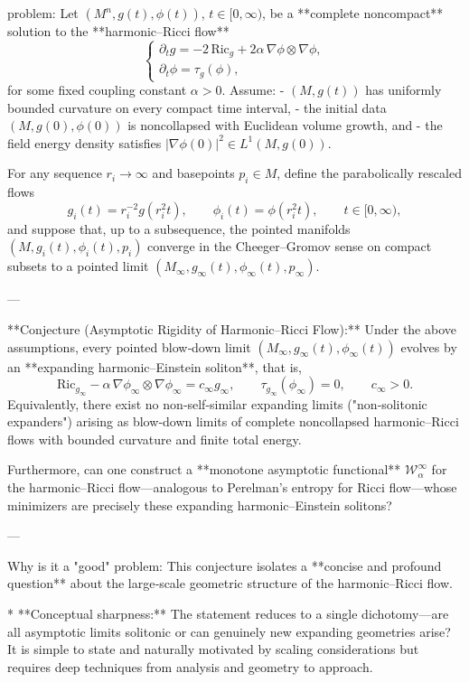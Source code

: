 problem:  
Let \((M^n,g(t),\phi(t))\), \(t\in[0,\infty)\), be a **complete noncompact** solution to the **harmonic–Ricci flow**
\[
\begin{cases}
\partial_t g = -2\,\mathrm{Ric}_g + 2\alpha\,\nabla\phi\otimes\nabla\phi, \\[3pt]
\partial_t \phi = \tau_g(\phi),
\end{cases}
\]
for some fixed coupling constant \(\alpha>0\).  
Assume:
- \((M,g(t))\) has uniformly bounded curvature on every compact time interval,
- the initial data \((M,g(0),\phi(0))\) is noncollapsed with Euclidean volume growth, and
- the field energy density satisfies \(|\nabla \phi(0)|^2\in L^1(M,g(0))\).  

For any sequence \(r_i\to\infty\) and basepoints \(p_i\in M\), define the parabolically rescaled flows
\[
g_i(t)=r_i^{-2}g(r_i^2t),\qquad \phi_i(t)=\phi(r_i^2t),\qquad t\in[0,\infty),
\]
and suppose that, up to a subsequence, the pointed manifolds \((M,g_i(t),\phi_i(t),p_i)\) converge in the Cheeger–Gromov sense on compact subsets to a pointed limit
\((M_\infty,g_\infty(t),\phi_\infty(t),p_\infty)\).

---

**Conjecture (Asymptotic Rigidity of Harmonic–Ricci Flow):**  
Under the above assumptions, every pointed blow‑down limit \((M_\infty,g_\infty(t),\phi_\infty(t))\) evolves by an **expanding harmonic–Einstein soliton**, that is,
\[
\mathrm{Ric}_{g_\infty}-\alpha\,\nabla\phi_\infty\otimes\nabla\phi_\infty=c_\infty g_\infty,\qquad
\tau_{g_\infty}(\phi_\infty)=0,\qquad c_\infty>0.
\]
Equivalently, there exist no non‑self‑similar expanding limits ("non‑solitonic expanders") arising as blow‑down limits of complete noncollapsed harmonic–Ricci flows with bounded curvature and finite total energy.  

Furthermore, can one construct a **monotone asymptotic functional** \(\mathcal{W}_\alpha^{\infty}\) for the harmonic–Ricci flow—analogous to Perelman’s entropy for Ricci flow—whose minimizers are precisely these expanding harmonic–Einstein solitons?

---

Why is it a "good" problem:  
This conjecture isolates a **concise and profound question** about the large‑scale geometric structure of the harmonic–Ricci flow.  

* **Conceptual sharpness:** The statement reduces to a single dichotomy—are all asymptotic limits solitonic or can genuinely new expanding geometries arise?  It is simple to state and naturally motivated by scaling considerations but requires deep techniques from analysis and geometry to approach.

